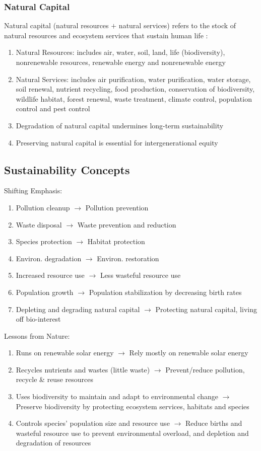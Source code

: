 \documentclass[12pt, a4paper]{article}
\begin{document}
\begin{multicols*}{3}
\subsubsection{Natural Capital}
Natural capital (natural resources $+$ natural services) refers to the stock of natural resources and ecosystem services that sustain human life :  
\begin{enumerate}[\roman*.]
  \item Natural Resources: includes air, water, soil, land, life (biodiversity), nonrenewable resources, renewable energy and nonrenewable energy
  \item Natural Services: includes air purification, water purification, water storage, soil renewal, nutrient recycling, food production, conservation of biodiversity, wildlife habitat, forest renewal, waste treatment, climate control, population control and pest control
  \item Degradation of natural capital undermines long-term sustainability
  \item Preserving natural capital is essential for intergenerational equity
\end{enumerate}


\colbreak
\subsection{Sustainability Concepts}
Shifting Emphasis:
\begin{enumerate}[\roman*.]
  \item Pollution cleanup $\rightarrow$ Pollution prevention
  \item Waste disposal $\rightarrow$ Waste prevention and reduction
  \item Species protection $\rightarrow$ Habitat protection
  \item Environ. degradation $\rightarrow$ Environ. restoration
  \item Increased resource use $\rightarrow$ Less wasteful resource use
  \item Population growth $\rightarrow$ Population stabilization by decreasing birth rates
  \item Depleting and degrading natural capital $\rightarrow$ Protecting natural capital, living off bio-interest
\end{enumerate}

Lessons from Nature:
\begin{enumerate}[\roman*.]
  \item Runs on renewable solar energy $\rightarrow$ Rely mostly on renewable solar energy
  \item Recycles nutrients and wastes (little waste) $\rightarrow$ Prevent/reduce pollution, recycle \& reuse resources
  \item Uses biodiversity to maintain and adapt to environmental change $\rightarrow$ Preserve biodiversity by protecting ecosystem services, habitats and species
  \item Controls species' population size and resource use $\rightarrow$ Reduce births and wasteful resource use to prevent environmental overload, and depletion and degradation of resources 
\end{enumerate}


\end{multicols*}
\end{document}
